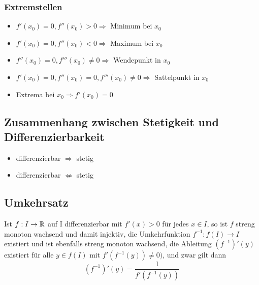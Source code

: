 \subsubsection{Extremstellen}
\begin{itemize}
	\item $f'(x_0) = 0, f''(x_0) > 0 \Rightarrow$ Minimum bei $x_0$
	\item $f'(x_0) = 0, f''(x_0) < 0 \Rightarrow$ Maximum bei $x_0$
	\item $f''(x_0) = 0, f'''(x_0) \neq 0 \Rightarrow$ Wendepunkt in $x_0$
	\item $f'(x_0) = 0, f''(x_0) = 0, f'''(x_0) \neq 0 \Rightarrow$ Sattelpunkt in
  	$x_0$
	\item Extrema bei $x_0 \Rightarrow f'(x_0) = 0$
\end{itemize}

\subsection{Zusammenhang zwischen Stetigkeit und Differenzierbarkeit}
\begin{itemize}
	\item differenzierbar $\Rightarrow$ stetig
	\item differenzierbar $\not\Leftarrow$ stetig
\end{itemize}

\subsection{Umkehrsatz}
Ist $f:I \to \mathbb{R}$ auf I differenzierbar mit $f'(x)>0$ für jedes $x \in I$, 
so ist $f$ streng monoton wachsend und damit injektiv, die Umkehrfunktion $f^{-1}:f(I) \to I$ existiert und ist ebenfalls streng monoton wachsend,
die Ableitung $(f^{-1})'(y)$ existiert für alle $y \in f(I)$ mit $f'(f^{-1}(y)) \neq 0)$, und zwar gilt dann \[
(f^{-1})'(y) = \frac{1}{f'(f^{-1}(y))}
\]
